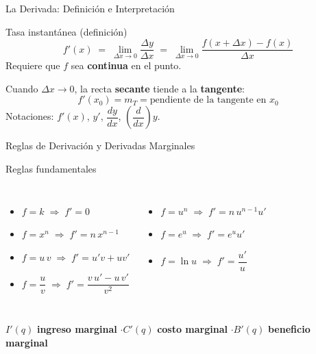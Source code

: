 \documentclass[aspectratio=169]{beamer}
\begin{document}
\begin{frame}{La Derivada: Definición e Interpretación}
  \begin{block}{Tasa instantánea (definición)}
    \[
      f'(x) \;=\; \lim_{\Delta x \to 0} \frac{\Delta y}{\Delta x}
      \;=\; \lim_{\Delta x \to 0} \frac{f(x + \Delta x) - f(x)}{\Delta x}
    \]
    Requiere que $f$ sea \textbf{continua} en el punto.
  \end{block}
  \vspace{4pt}
  \begin{mwextra}
    Cuando $\Delta x \to 0$, la recta \textbf{secante} tiende a la \textbf{tangente}:
    \[
      f'(x_0) = m_T = \text{pendiente de la tangente en } x_0
    \]
    Notaciones: $f'(x)$, $y'$, $\dfrac{dy}{dx}$, $\left(\dfrac{d}{dx}\right)y$.
  \end{mwextra}
\end{frame}

\begin{frame}{Reglas de Derivación y Derivadas Marginales}
  \begin{block}{Reglas fundamentales}
    \begin{columns}[T]
      \begin{itemize}
        \item $f = k \;\Rightarrow\; f' = 0$
        \item $f = x^{n} \;\Rightarrow\; f' = n\,x^{n-1}$
        \item $f = u\,v \;\Rightarrow\; f' = u'v + uv'$
        \item $f = \dfrac{u}{v} \;\Rightarrow\; f' = \dfrac{v\,u' - u\,v'}{v^{2}}$
      \end{itemize}
      \begin{itemize}
        \item $f = u^{n} \;\Rightarrow\; f' = n\,u^{n-1}u'$
        \item $f = e^{u} \;\Rightarrow\; f' = e^{u}u'$
        \item $f = \ln u \;\Rightarrow\; f' = \dfrac{u'}{u}$
      \end{itemize}
    \end{columns}
  \end{block}
  \vspace{2pt}
  \begin{mwpasos}
    $I'(q)$ \textbf{ingreso marginal} \quad$\cdot$\quad $C'(q)$ \textbf{costo marginal} \quad$\cdot$\quad $B'(q)$ \textbf{beneficio marginal}
  \end{mwpasos}
\end{frame}
\end{document}
